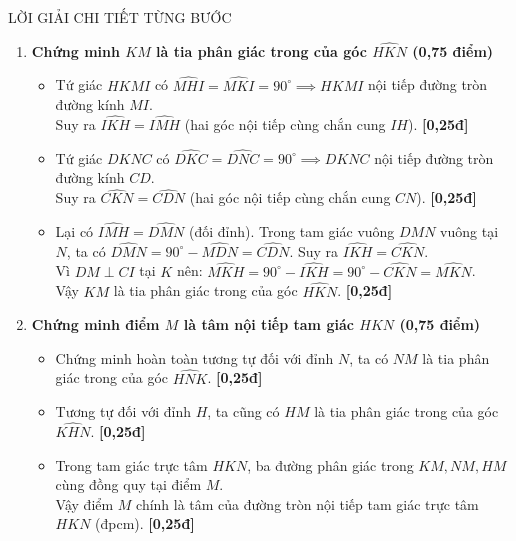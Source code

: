 \documentclass[11pt,a4paper]{article}
\begin{document}
\begin{solutionbox}{LỜI GIẢI CHI TIẾT TỪNG BƯỚC}
\begin{enumerate}[label=\textbf{\arabic*.}, leftmargin=*]
    \vspace{1mm}
    \item \textbf{Chứng minh $KM$ là tia phân giác trong của góc $\widehat{HKN}$ (0,75 điểm)}
    \begin{itemize}[leftmargin=*, nosep]
        \item Tứ giác $HKMI$ có $\widehat{MHI} = \widehat{MKI} = 90^\circ \implies HKMI$ nội tiếp đường tròn đường kính $MI$.\\
        Suy ra $\widehat{IKH} = \widehat{IMH}$ (hai góc nội tiếp cùng chắn cung $IH$). \hfill \textbf{[0,25đ]}
        \item Tứ giác $DKNC$ có $\widehat{DKC} = \widehat{DNC} = 90^\circ \implies DKNC$ nội tiếp đường tròn đường kính $CD$.\\
        Suy ra $\widehat{CKN} = \widehat{CDN}$ (hai góc nội tiếp cùng chắn cung $CN$). \hfill \textbf{[0,25đ]}
        \item Lại có $\widehat{IMH} = \widehat{DMN}$ (đối đỉnh). Trong tam giác vuông $DMN$ vuông tại $N$, ta có $\widehat{DMN} = 90^\circ - \widehat{MDN} = \widehat{CDN}$. Suy ra $\widehat{IKH} = \widehat{CKN}$.\\
        Vì $DM \perp CI$ tại $K$ nên: $\widehat{MKH} = 90^\circ - \widehat{IKH} = 90^\circ - \widehat{CKN} = \widehat{MKN}$.\\
        Vậy $KM$ là tia phân giác trong của góc $\widehat{HKN}$. \hfill \textbf{[0,25đ]}
    \end{itemize}

    \vspace{1mm}
    \item \textbf{Chứng minh điểm $M$ là tâm nội tiếp tam giác $HKN$ (0,75 điểm)}
    \begin{itemize}[leftmargin=*, nosep]
        \item Chứng minh hoàn toàn tương tự đối với đỉnh $N$, ta có $NM$ là tia phân giác trong của góc $\widehat{HNK}$. \hfill \textbf{[0,25đ]}
        \item Tương tự đối với đỉnh $H$, ta cũng có $HM$ là tia phân giác trong của góc $\widehat{KHN}$. \hfill \textbf{[0,25đ]}
        \item Trong tam giác trực tâm $HKN$, ba đường phân giác trong $KM, NM, HM$ cùng đồng quy tại điểm $M$.\\
        Vậy điểm $M$ chính là tâm của đường tròn nội tiếp tam giác trực tâm $HKN$ (đpcm). \hfill \textbf{[0,25đ]}
    \end{itemize}
\end{enumerate}
\end{solutionbox}
\end{document}
